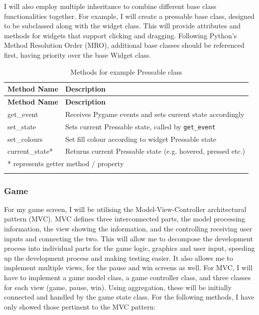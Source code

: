 \documentclass[../main/main.tex]{subfiles}
\begin{document}
I will also employ multiple inheritance to combine different base class functionalities together. For example, I will create a pressable base class, designed to be subclassed along with the widget class. This will provide attributes and methods for widgets that support clicking and dragging. Following Python's Method Resolution Order (MRO), additional base classes should be referenced first, having priority over the base Widget class.

\begin{longtable}[c]{l|l}
    \toprule
    \textbf{Method Name} & \textbf{Description}\\
    \midrule
    \endfirsthead
    \textbf{Method Name} & \textbf{Description}\\
    \midrule
    \endhead

    get\_event & Receives Pygame events and sets current state accordingly\\
    set\_state & Sets current Pressable state, called by \lstinline[language=Python]{get_event}\\
    set\_colours & Set fill colour according to widget Pressable state\\
    current\_state* & Returns current Pressable state (e.g. hovered, pressed etc.)\\

    \midrule

    \multicolumn{2}{l}{* represents getter method / property}\\

    \bottomrule
    
\caption{Methods for example Pressable class}
\label{tab:pressable-methods}
\end{longtable}

\subsubsection*{Game}
For my game screen, I will be utilising the Model-View-Controller architectural pattern (MVC). MVC defines three interconnected parts, the model processing information, the view showing the information, and the controlling receiving user inputs and connecting the two. This will allow me to decompose the development process into individual parts for the game logic, graphics and user input, speeding up the development process and making testing easier. It also allows me to implement multiple views, for the pause and win screens as well. For MVC, I will have to implement a game model class, a game controller class, and three classes for each view (game, pause, win). Using aggregation, these will be initially connected and handled by the game state class. For the following methods, I have only showed those pertinent to the MVC pattern: 
\end{document}
